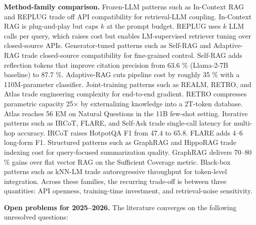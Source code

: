 \documentclass{article}
\begin{document}
\textbf{Method-family comparison.} Frozen-LLM patterns such as In-Context RAG and REPLUG trade off API compatibility for retrieval-LLM coupling. In-Context RAG is plug-and-play but caps \(k\) at the prompt budget. REPLUG uses \(k\) LLM calls per query, which raises cost but enables LM-supervised retriever tuning over closed-source APIs. Generator-tuned patterns such as Self-RAG and Adaptive-RAG trade closed-source compatibility for fine-grained control. Self-RAG adds reflection tokens that improve citation precision from 63.6 \% (Llama-2-7B baseline) to 87.7 \%. Adaptive-RAG cuts pipeline cost by roughly 35 \% with a 110M-parameter classifier. Joint-training patterns such as REALM, RETRO, and Atlas trade engineering complexity for end-to-end gradient. RETRO compresses parametric capacity 25× by externalizing knowledge into a 2T-token database. Atlas reaches 56 EM on Natural Questions in the 11B few-shot setting. Iterative patterns such as IRCoT, FLARE, and Self-Ask trade single-call latency for multi-hop accuracy. IRCoT raises HotpotQA F1 from 47.4 to 65.8. FLARE adds 4--6 long-form F1. Structured patterns such as GraphRAG and HippoRAG trade indexing cost for query-focused summarization quality. GraphRAG delivers 70--80 \% gains over flat vector RAG on the Sufficient Coverage metric. Black-box patterns such as kNN-LM trade autoregressive throughput for token-level integration. Across these families, the recurring trade-off is between three quantities: API openness, training-time investment, and retrieval-noise sensitivity.

\textbf{Open problems for 2025--2026.} The literature converges on the following unresolved questions:
\end{document}
